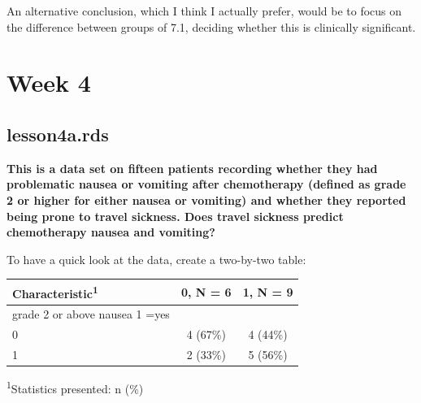 \documentclass[]{book}
\newenvironment{Shaded}{\begin{snugshade}}{\end{snugshade}}
\newcommand{\DataTypeTok}[1]{\textcolor[rgb]{0.13,0.29,0.53}{#1}}
\newcommand{\KeywordTok}[1]{\textcolor[rgb]{0.13,0.29,0.53}{\textbf{#1}}}
\newcommand{\NormalTok}[1]{#1}
\newcommand{\OperatorTok}[1]{\textcolor[rgb]{0.81,0.36,0.00}{\textbf{#1}}}
\newcommand{\StringTok}[1]{\textcolor[rgb]{0.31,0.60,0.02}{#1}}
\begin{document}
An alternative conclusion, which I think I actually prefer, would be to
focus on the difference between groups of 7.1, deciding whether this is
clinically significant.

\hypertarget{week-4-1}{%
\section{Week 4}\label{week-4-1}}

\hypertarget{lesson4a.rds}{%
\subsection{lesson4a.rds}\label{lesson4a.rds}}

\textbf{This is a data set on fifteen patients recording whether they
had problematic nausea or vomiting after chemotherapy (defined as grade
2 or higher for either nausea or vomiting) and whether they reported
being prone to travel sickness. Does travel sickness predict
chemotherapy nausea and vomiting?}

To have a quick look at the data, create a two-by-two table:

\begin{Shaded}
\end{Shaded}

\captionsetup[table]{labelformat=empty,skip=1pt}
\begin{longtable}{lcc}
\toprule
\textbf{Characteristic}\textsuperscript{1} & \textbf{0}, N = 6 & \textbf{1}, N = 9 \\ 
\midrule
grade 2 or above nausea 1 =yes &  &  \\ 
0 & 4 (67\%) & 4 (44\%) \\ 
1 & 2 (33\%) & 5 (56\%) \\ 
\bottomrule
\end{longtable}
\vspace{-5mm}
\begin{minipage}{\linewidth}
\textsuperscript{1}Statistics presented: n (\%) \\ 
\end{minipage}
\end{document}
